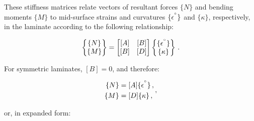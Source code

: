\documentclass[twocolumn, linenumbers, superscriptaddress]{revtex4-1}
\begin{document}
				These stiffness matrices relate vectors of resultant forces $\{N\}$ and bending moments $\{M\}$ to mid-surface strains and curvatures $\{\epsilon^{\degree}\}$ and $\{\kappa\}$, respectively, in the laminate according to the following relationship:
				
				\begin{equation}
					\begin{Bmatrix}
						\{N\} \\
						\{M\}
					\end{Bmatrix}
					=
					\begin{bmatrix}
						[A] & [B] \\
						[B] & [D]
					\end{bmatrix}
					\begin{Bmatrix}
					\{\epsilon^{\degree}\} \\
					\{\kappa\}
					\end{Bmatrix}\,.
				\end{equation}
				
				For symmetric laminates, $[B] = 0$, and therefore:
				
				\begin{equation}
				\label{eqn::abbd}
					\begin{aligned}
						\{N\} & = [A]\{\epsilon^{\degree}\}\,, \\
						\{M\} & = [D]\{\kappa\}\,,						
					\end{aligned}\,,
				\end{equation}
				
				or, in expanded form:
				
\end{document}
